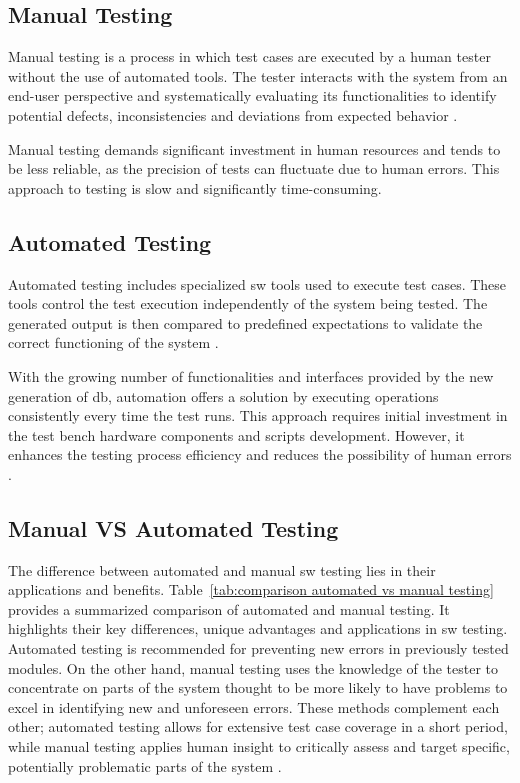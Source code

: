 \subsection{Manual Testing}

Manual testing is a process in which test cases are executed by a human tester without the use of automated tools. The tester interacts with the system from an end-user perspective and systematically evaluating its functionalities to identify potential defects, inconsistencies and deviations from expected behavior \cite{shiwangi2014}.
    
Manual testing demands significant investment in human resources and tends to be less reliable, as the precision of tests can fluctuate due to human errors. This approach to testing is slow and significantly time-consuming.


\subsection{Automated Testing}

Automated testing includes specialized \gls{sw} tools used to execute test cases. These tools control the test execution independently of the system being tested. The generated output is then compared to predefined expectations to validate the correct functioning of the system \cite{leloudas2023, shiwangi2014}.

With the growing number of functionalities and interfaces provided by the new generation of \gls{db}, automation offers a solution by executing operations consistently every time the test runs. This approach requires initial investment in the test bench hardware components and scripts development. However, it enhances the testing process efficiency and reduces the possibility of human errors \cite{shiwangi2014}.

\subsection{Manual VS Automated Testing}

The difference between automated and manual \gls{sw} testing lies in their applications and benefits. Table~\ref{tab:comparison automated vs manual testing} provides a summarized comparison of automated and manual testing. It highlights their key differences, unique advantages and applications in \gls{sw} testing. Automated testing is recommended for preventing new errors in previously tested modules. On the other hand, manual testing uses the knowledge of the tester to concentrate on parts of the system thought to be more likely to have problems to excel in identifying new and unforeseen errors. These methods complement each other; automated testing allows for extensive test case coverage in a short period, while manual testing applies human insight to critically assess and target specific, potentially problematic parts of the system \cite{shiwangi2014}. 

